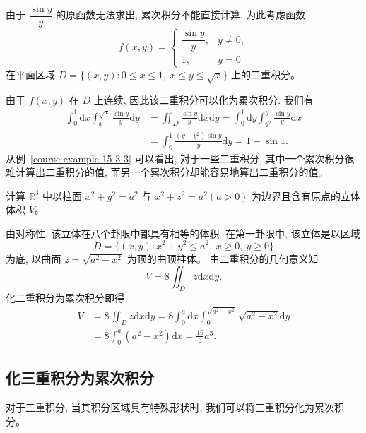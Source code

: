 \documentclass[12pt,fontset=fandol]{ctexart}
\begin{document}
\begin{solve}\quad 由于 $\dfrac{\sin y}{y}$ 的原函数无法求出, 累次积分不能直接计算. 为此考虑函数
\[
  f(x,y)=
  \begin{cases}
    \dfrac{\sin y}{y}, & y\ne0,\\
    1, & y=0
  \end{cases}
\]
在平面区域 $D=\{(x,y):0\leqslant x\leqslant1,\ x\leqslant y\leqslant\sqrt x\}$ 上的二重积分。

由于 $f(x,y)$ 在 $D$ 上连续, 因此该二重积分可以化为累次积分. 我们有
\[
\begin{aligned}
  \int_0^1\mathrm dx\int_x^{\sqrt x}\frac{\sin y}{y}\mathrm dy
  &=\iint_D\frac{\sin y}{y}\mathrm dx\mathrm dy
    =\int_0^1\mathrm dy\int_{y^2}^{y}\frac{\sin y}{y}\mathrm dx\\
  &=\int_0^1\frac{(y-y^2)\sin y}{y}\mathrm dy
    =1-\sin1.
\end{aligned}
\]
从例~\ref{course-example-15-3-3}  可以看出, 对于一些二重积分, 其中一个累次积分很难计算出二重积分的值, 而另一个累次积分却能容易地算出二重积分的值。

\end{solve}
\begin{example}\label{course-example-15-3-4}\quad 计算 $\mathbb R^3$ 中以柱面 $x^2+y^2=a^2$ 与 $x^2+z^2=a^2(a>0)$ 为边界且含有原点的立体体积 $V$。

\end{example}
\begin{solve}\quad 由对称性, 该立体在八个卦限中都具有相等的体积. 在第一卦限中, 该立体是以区域
\[
  D=\{(x,y):x^2+y^2\leqslant a^2,\ x\geqslant0,\ y\geqslant0\}
\]
为底, 以曲面 $z=\sqrt{a^2-x^2}$ 为顶的曲顶柱体。
由二重积分的几何意义知
\[
  V=8\iint_D z\mathrm dx\mathrm dy.
\]
化二重积分为累次积分即得
\[
\begin{aligned}
  V
  &=8\iint_D z\mathrm dx\mathrm dy
    =8\int_0^a\mathrm dx\int_0^{\sqrt{a^2-x^2}}\sqrt{a^2-x^2}\mathrm dy\\
  &=8\int_0^a(a^2-x^2)\mathrm dx
    =\frac{16}{3}a^3.
\end{aligned}
\]

\end{solve}
\subsection{化三重积分为累次积分}

对于三重积分, 当其积分区域具有特殊形状时, 我们可以将三重积分化为累次积分。
\end{document}
